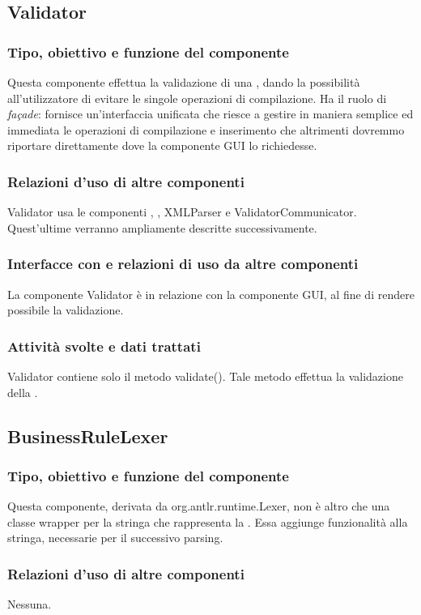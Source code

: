\subsection{Validator}%
\subsubsection{Tipo, obiettivo e funzione del componente}
Questa componente effettua la validazione di una \br, dando la possibilit\`a all'utilizzatore di evitare le singole operazioni di compilazione. Ha il ruolo di \textit{fa\c{c}ade}: fornisce un'interfaccia unificata che riesce a gestire in maniera semplice ed immediata le operazioni di compilazione e inserimento che altrimenti dovremmo riportare direttamente dove la componente GUI lo richiedesse.
\subsubsection{Relazioni d'uso di altre componenti}
Validator usa le componenti \brp, \brl, XMLParser e ValidatorCommunicator. Quest'ultime verranno ampliamente descritte successivamente.
\subsubsection{Interfacce con e relazioni di uso da altre componenti}
La componente Validator \`e in relazione con la componente GUI, al fine di rendere possibile la validazione.
\subsubsection{Attivit\`a svolte e dati trattati}
Validator contiene solo il metodo validate(). Tale metodo effettua la validazione della \br.

\subsection{BusinessRuleLexer}
\subsubsection{Tipo, obiettivo e funzione del componente}
Questa componente, derivata da org.antlr.runtime.Lexer, non \`e altro che una classe wrapper per la stringa che rappresenta la \br. Essa aggiunge funzionalit\`a alla stringa, necessarie per il successivo parsing.
\subsubsection{Relazioni d'uso di altre componenti}
Nessuna.
